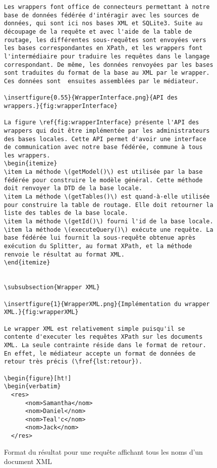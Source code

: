 \documentclass[a4paper,10pt]{article}
\newcommand{\fref}[1]{Figure~\ref{#1}}
\newcommand{\insertfigure}[4]{
\begin{figure}[ht!]
\begin{center}
\texttt{[image: \#2]}
\caption{#3}
\label{#4}
\end{center}
\end{figure}
}
\begin{document}
\begin{figure}[ht!]
\begin{verbatim}
Les wrappers font office de connecteurs permettant à notre base de données fédérée d'intéragir avec les sources de données, qui sont ici nos bases XML et SQLite3. Suite au découpage de la requête et avec l'aide de la table de routage, les différentes sous-requêtes sont envoyées vers les bases correspondantes en XPath, et les wrappers font l'intermédiaire pour traduire les requêtes dans le langage correspondant. De même, les données renvoyées par les bases sont traduites du format de la base au XML par le wrapper. Ces données sont  ensuites assemblées par le médiateur.

\insertfigure{0.55}{WrapperInterface.png}{API des wrappers.}{fig:wrapperInterface}

La figure \ref{fig:wrapperInterface} présente l'API des wrappers qui doit être implémentée par les administrateurs des bases locales. Cette API permet d'avoir une interface de communication avec notre base fédérée, commune à tous les wrappers.
\begin{itemize}
\item La méthode \(getModel()\) est utilisée par la base fédérée pour construire le modèle général. Cette méthode doit renvoyer la DTD de la base locale. 
\item La méthode \(getTables()\) est quand-à-elle utilisée pour construire la table de routage. Elle doit retourner la liste des tables de la base locale. 
\item la méthode \(getId()\) fourni l'id de la base locale. 
\item la méthode \(executeQuery()\) exécute une requête. La base fédérée lui fournit la sous-requête obtenue après exécution du Splitter, au format XPath, et la méthode renvoie le résultat au format XML.
\end{itemize}


\subsubsection{Wrapper XML}

\insertfigure{1}{WrapperXML.png}{Implémentation du wrapper XML.}{fig:wrapperXML}

Le wrapper XML est relativement simple puisqu'il se contente d'executer les requêtes XPath sur les documents XML. La seule contrainte réside dans le format de retour. En effet, le médiateur accepte un format de données de retour très précis (\fref{lst:retour}).

\begin{figure}[ht!]
\begin{verbatim}
  <res>
      <nom>Samantha</nom>
      <nom>Daniel</nom>
      <nom>Teal'c</nom>
      <nom>Jack</nom>
  </res>
\end{verbatim}
\caption{Format du résultat pour une requête affichant tous les noms d'un document XML}
\label{lst:retour}
\end{figure}
\end{document}
